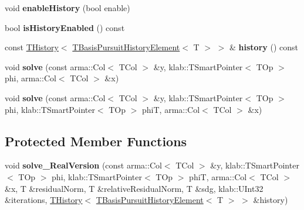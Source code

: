 \begin{DoxyCompactItemize}
\item 
void {\bfseries enable\+History} (bool enable)\hypertarget{classkl1p_1_1TBasisPursuitSolver_ac9fe5b6619fd6aea0375b0a90d0a497c}{}\label{classkl1p_1_1TBasisPursuitSolver_ac9fe5b6619fd6aea0375b0a90d0a497c}

\item 
bool {\bfseries is\+History\+Enabled} () const \hypertarget{classkl1p_1_1TBasisPursuitSolver_a594183ddd3592c96101802bb6228b996}{}\label{classkl1p_1_1TBasisPursuitSolver_a594183ddd3592c96101802bb6228b996}

\item 
const \hyperlink{classkl1p_1_1THistory}{T\+History}$<$ \hyperlink{classkl1p_1_1TBasisPursuitHistoryElement}{T\+Basis\+Pursuit\+History\+Element}$<$ T $>$ $>$ \& {\bfseries history} () const \hypertarget{classkl1p_1_1TBasisPursuitSolver_a090cafd2a97a7916a057dd96eb7a00ad}{}\label{classkl1p_1_1TBasisPursuitSolver_a090cafd2a97a7916a057dd96eb7a00ad}

\item 
void {\bfseries solve} (const arma\+::\+Col$<$ T\+Col $>$ \&y, klab\+::\+T\+Smart\+Pointer$<$ T\+Op $>$ phi, arma\+::\+Col$<$ T\+Col $>$ \&x)\hypertarget{classkl1p_1_1TBasisPursuitSolver_a40c6219b30228f89ddc562944ca0de25}{}\label{classkl1p_1_1TBasisPursuitSolver_a40c6219b30228f89ddc562944ca0de25}

\item 
void {\bfseries solve} (const arma\+::\+Col$<$ T\+Col $>$ \&y, klab\+::\+T\+Smart\+Pointer$<$ T\+Op $>$ phi, klab\+::\+T\+Smart\+Pointer$<$ T\+Op $>$ phiT, arma\+::\+Col$<$ T\+Col $>$ \&x)\hypertarget{classkl1p_1_1TBasisPursuitSolver_a9c8558fc3903e0281d2d9bf9ec38fc3c}{}\label{classkl1p_1_1TBasisPursuitSolver_a9c8558fc3903e0281d2d9bf9ec38fc3c}

\end{DoxyCompactItemize}
\subsection*{Protected Member Functions}
\begin{DoxyCompactItemize}
\item 
void {\bfseries solve\+\_\+\+Real\+Version} (const arma\+::\+Col$<$ T\+Col $>$ \&y, klab\+::\+T\+Smart\+Pointer$<$ T\+Op $>$ phi, klab\+::\+T\+Smart\+Pointer$<$ T\+Op $>$ phiT, arma\+::\+Col$<$ T\+Col $>$ \&x, T \&residual\+Norm, T \&relative\+Residual\+Norm, T \&sdg, klab\+::\+U\+Int32 \&iterations, \hyperlink{classkl1p_1_1THistory}{T\+History}$<$ \hyperlink{classkl1p_1_1TBasisPursuitHistoryElement}{T\+Basis\+Pursuit\+History\+Element}$<$ T $>$ $>$ \&history)\hypertarget{classkl1p_1_1TBasisPursuitSolver_a667e83828792e2fef99dd7870f50bff8}{}\label{classkl1p_1_1TBasisPursuitSolver_a667e83828792e2fef99dd7870f50bff8}

\end{DoxyCompactItemize}
